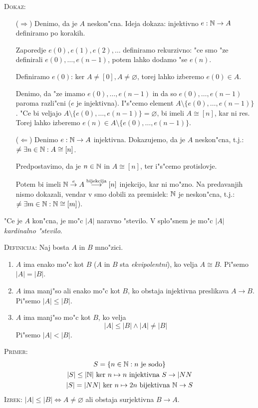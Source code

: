 \textsc{Dokaz:}
\begin{itemize}
	\item[($\Rightarrow$)] Denimo, da je $A$ neskon"cna. Ideja dokaza: injektivno $e: \mathbb{N} \to A$ definiramo po korakih.
	
	Zaporedje $e(0), e(1), e(2), \ldots$ definiramo rekurzivno: "ce smo "ze definirali $e(0), \ldots, e(n-1)$, potem lahko dodamo "se $e(n)$.
	
	Definiramo $e(0)$: ker $A \neq [0], A \neq \varnothing$, torej lahko izberemo $e(0) \in A$.
	
	Denimo, da "ze imamo $e(0), \ldots, e(n-1)$ in da so $e(0), \ldots, e(n-1)$ paroma razli"cni ($e$ je injektivna). I"s"cemo element $A \setminus \{e(0), \ldots, e(n-1)\}$. "Ce bi veljajo $A \setminus \{e(0), \ldots, e(n-1)\} = \varnothing$, bi imeli $A \cong [n]$, kar ni res. Torej lahko izberemo $e(n) \in A \setminus \{e(0), \ldots, e(n-1)\}$.
	
	\item[($\Leftarrow$)] Denimo $e: \mathbb{N} \to A$ injektivna. Dokazujemo, da je $A$ neskon"cna, t.j.: $\neq \exists n \in \mathbb{N}: A \cong [n]$.
	
	Predpostavimo, da je $n \in \mathbb{N}$ in $A \cong [n]$, ter i"s"cemo protislovje.
	
	Potem bi imeli $\mathbb{N} \stackrel{e}{\to} A \stackrel{\text{bijekcija}}{\longrightarrow}[n]$ injekcijo, kar ni mo"zno. Na predavanjih nismo dokazali, vendar v smo dobili za premislek: $\mathbb{N}$ je neskon"cna, t.j.: $\neq \exists m \in \mathbb{N} : \mathbb{N} \cong [m]$).
\end{itemize}
%
"Ce je $A$ kon"cna, je mo"c $|A|$ naravno "stevilo. V splo"snem je mo"c $|A|$ \emph{kardinalno "stevilo}.

\textsc{Definicija:} Naj bosta $A$ in $B$ mno"zici.
\begin{enumerate}
	\item $A$ ima enako mo"c kot $B$ ($A$ in $B$ sta \emph{ekvipolentni}), ko velja $A \cong B$. Pi"semo $|A| = |B|$.
	
	\item $A$ ima manj"so ali enako mo"c kot $B$, ko obstaja injektivna preslikava $A \to B$. Pi"semo $|A| \leq |B|$.
	
	\item $A$ ima manj"so mo"c kot $B$, ko velja
	\begin{equation*}
	|A| \leq |B| \land |A| \neq |B|
	\end{equation*}
	Pi"semo $|A| < |B|$.
\end{enumerate}
\textsc{Primer:}
\begin{gather*}
S = \{n \in \mathbb{N}: \text{$n$ je sodo}\} \\
|S| \leq |\mathbb{N}| \text{ ker $n \mapsto n$ injektivna $S \to |NN$} \\
|S| = |NN| \text{ ker $n \mapsto 2n$ bijektivna $\mathbb{N} \to S$}
\end{gather*}
%
\textsc{Izrek:} $|A| \leq |B| \iff A \neq \varnothing$ ali obstaja surjektivna $B \to A$.

